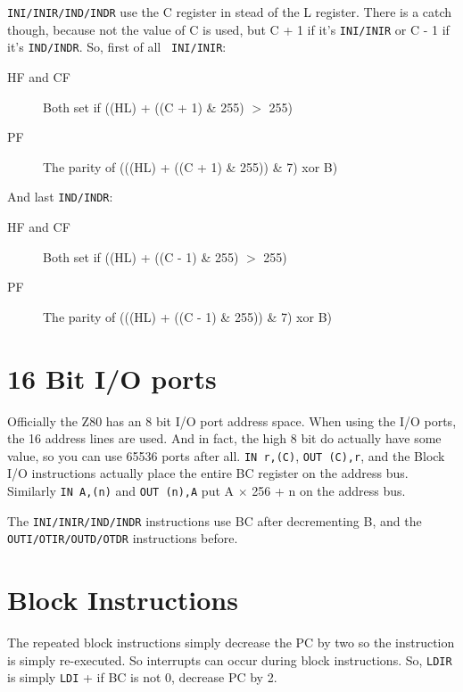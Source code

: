 \documentclass[oneside,a4paper]{book}
\begin{document}
{\tt INI/INIR/IND/INDR} use the C register in stead of the L register. There 
is a catch though, because not the value of C is used, but C + 1 if it's
{\tt INI/INIR} or C - 1 if it's {\tt IND/INDR}. So, first of all {\tt 
INI/INIR}:

\begin{description}

\item[HF and CF]
  Both set if ((HL) + ((C + 1) \& 255)  $>$ 255)

\item[PF]
  The parity of (((HL) + ((C + 1) \& 255)) \& 7) xor B)

\end{description}

And last {\tt IND/INDR}:

\begin{description}

\item[HF and CF]
  Both set if ((HL) + ((C - 1) \& 255) $>$ 255)

\item[PF]
  The parity of (((HL) + ((C - 1) \& 255)) \& 7) xor B)

\end{description}


\section{16 Bit I/O ports}

Officially the Z80 has an 8 bit I/O port address space. When using the I/O
ports, the 16 address lines are used. And in fact, the high 8 bit do actually
have some value, so you can use 65536 ports after all. {\tt IN r,(C)},
{\tt OUT (C),r}, and the Block I/O instructions  actually place the entire BC
register on the address bus. Similarly {\tt IN A,(n)} and {\tt OUT (n),A} put
A $\times$ 256 + n on the address bus.

The {\tt INI/INIR/IND/INDR} instructions use BC after decrementing B, and
the {\tt OUTI/OTIR/OUTD/OTDR} instructions before.


\section{Block Instructions}

The repeated block instructions simply decrease the PC by two so the 
instruction is simply re-executed. So interrupts can occur during block 
instructions. So, {\tt LDIR} is simply {\tt LDI} + if BC is not 0, decrease 
PC by 2.
\end{document}
